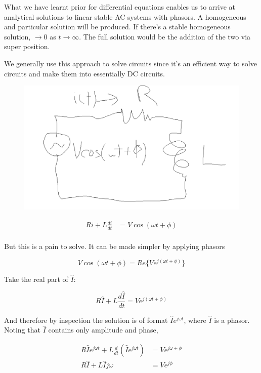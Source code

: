 \documentclass[../notes.tex]{subfiles}
\begin{document}
What we have learnt prior for differential equations enables us to arrive at analytical solutions to linear stable AC systems with phasors.
A homogeneous and particular solution will be produced.
If there's a stable homogeneous solution, $ \to 0 $ as $ t \to \infty $. The full solution would be the addition of the two via super position.

We generally use this approach to solve circuits since it's an efficient way to solve circuits and make them into essentially DC circuits.

\begin{figure}[H]
	\centering
	\includegraphics[width=0.8\linewidth]{img/image_2022-09-09-15-23-06.png}
\end{figure}

\begin{equation}
	\begin{split}
		Ri + L \frac{di}{dt} &= V \cos{(\omega t + \phi)}  \\
	\end{split}
\end{equation}


But this is a pain to solve. It can be made simpler by applying phasors

\begin{equation}
	V \cos{(\omega t + \phi)}  = Re\{ Ve^{j(\omega t + \phi)} \}
\end{equation}

Take the real part of $ \hat{I} $:

\begin{equation}
	R \hat{I} + L \frac{d\hat{I}}{dt} = Ve^{j(\omega t + \phi)}
\end{equation}


And therefore by inspection the solution is of format $ \hat{I} e^{j\omega t} $, where $ \hat{I} $ is a phasor. Noting that $ \hat{I} $  contains only amplitude and phase,

\begin{equation}
	\begin{split}
	R \hat{I} e ^{j \omega t} + L \frac{d}{dt}(\hat{I} e^{j \omega t}) &= Ve^{j \omega + \phi} \\
		R \hat{I} + L \hat{I} j \omega  &= Ve^{j \phi} \\
\end{split}
\end{equation}
\end{document}
